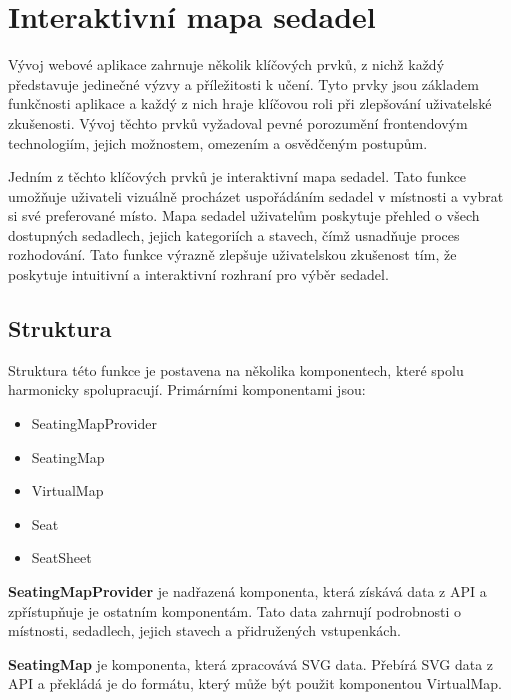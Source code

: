 \section{Interaktivní mapa sedadel}
\label{sec:implementace-seating}
Vývoj webové aplikace zahrnuje několik klíčových prvků, z nichž každý představuje jedinečné výzvy a příležitosti k učení.
Tyto prvky jsou základem funkčnosti aplikace a každý z nich hraje klíčovou roli při zlepšování uživatelské zkušenosti.
Vývoj těchto prvků vyžadoval pevné porozumění frontendovým technologiím, jejich možnostem, omezením a osvědčeným postupům.

Jedním z těchto klíčových prvků je interaktivní mapa sedadel.
Tato funkce umožňuje uživateli vizuálně procházet uspořádáním sedadel v místnosti a vybrat si své preferované místo.
Mapa sedadel uživatelům poskytuje přehled o všech dostupných sedadlech, jejich kategoriích a stavech, čímž usnadňuje proces rozhodování.
Tato funkce výrazně zlepšuje uživatelskou zkušenost tím, že poskytuje intuitivní a interaktivní rozhraní pro výběr sedadel.

\subsection{Struktura}
\label{subsec:implementace-seating-struktura}
Struktura této funkce je postavena na několika komponentech, které spolu harmonicky spolupracují.
Primárními komponentami jsou:

\begin{itemize}
	\item SeatingMapProvider
	\item SeatingMap
	\item VirtualMap
	\item Seat
	\item SeatSheet
\end{itemize}

\textbf{SeatingMapProvider} je nadřazená komponenta, která získává data z API a zpřístupňuje je ostatním komponentám.
Tato data zahrnují podrobnosti o místnosti, sedadlech, jejich stavech a přidružených vstupenkách.

\textbf{SeatingMap} je komponenta, která zpracovává SVG data.
Přebírá SVG data z API a překládá je do formátu, který může být použit komponentou VirtualMap.

